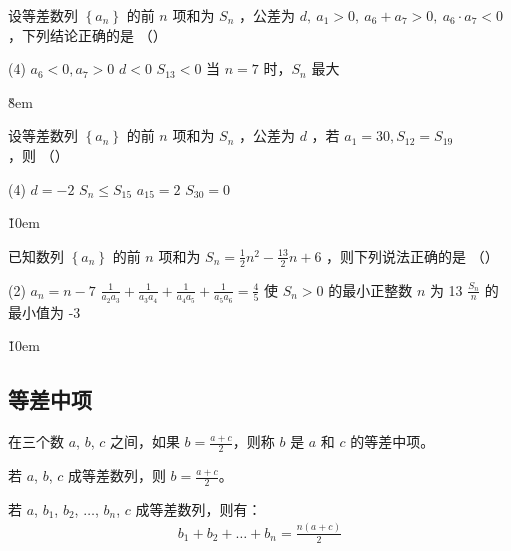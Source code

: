 \begin{example}
    设等差数列 $\left\{a_n\right\}$ 的前 $n$ 项和为 $S_n$ ，公差为 $d, ~ a_1>0, ~ a_6+a_7>0, ~ a_6 \cdot a_7<0$ ，下列结论正确的是 （\qquad）
    \begin{tasks}(4)
        \task $a_6<0, a_7>0$
        \task $d<0$
        \task $S_{13}<0$
        \task 当 $n=7$ 时，$S_n$ 最大
    \end{tasks}
\end{example}

\v{8em}

\begin{example}
    设等差数列 $\left\{a_n\right\}$ 的前 $n$ 项和为 $S_n$ ，公差为 $d$ ，若 $a_1=30, S_{12}=S_{19}$ ，则 （\qquad）
    \begin{tasks}(4)
        \task $d=-2$
        \task $S_n \leq S_{15}$
        \task $a_{15}=2$
        \task $S_{30}=0$
    \end{tasks}
\end{example}

\v{10em}

\begin{example}
    已知数列 $\left\{a_n\right\}$ 的前 $n$ 项和为 $S_n=\frac{1}{2} n^2-\frac{13}{2} n+6$ ，则下列说法正确的是 （\qquad）
    \begin{tasks}(2)
        \task $a_n=n-7$
        \task $\frac{1}{a_2 a_3}+\frac{1}{a_3 a_4}+\frac{1}{a_4 a_5}+\frac{1}{a_5 a_6}=\frac{4}{5}$
        \task 使 $S_n>0$ 的最小正整数 $n$ 为 13
        \task $\frac{S_n}{n}$ 的最小值为 -3
    \end{tasks}
\end{example}

\v{10em}

\subsection{等差中项}

\begin{definition}
    在三个数 $a$, $b$, $c$ 之间，如果 $b = \frac{a+c}{2}$，则称 $b$ 是 $a$ 和 $c$ 的等差中项。
\end{definition}

\begin{theorem}
    若 $a$, $b$, $c$ 成等差数列，则 $b = \frac{a+c}{2}$。

    若 $a$, $b_1$, $b_2$, $\ldots$, $b_n$, $c$ 成等差数列，则有：
    \begin{align}
        b_1 + b_2 + \ldots + b_n = \frac{n(a+c)}{2}
    \end{align}
\end{theorem}

